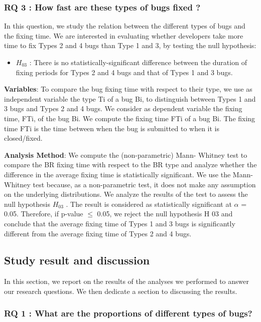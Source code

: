 \subsubsection{RQ 3 : How fast are these types of bugs fixed ?}

In this question, we study the relation between the
different types of bugs and the fixing time. We are interested
in evaluating whether developers take more time to fix Types
2 and 4 bugs than Type 1 and 3, by testing the null hypothesis:

\begin{itemize}
	\item $H_{03}$ : There is no statistically-significant difference
between the duration of fixing periods for Types 2 and
4 bugs and that of Types 1 and 3 bugs.
\end{itemize}


{\bf Variables}: To compare the bug fixing time with respect to
their type, we use as independent variable the type Ti of a
bug Bi, to distinguish between Types 1 and 3 bugs and Types
2 and 4 bugs. We consider as dependent variable the fixing
time, FTi, of the bug Bi. We compute the fixing time FTi of a
bug Bi. The fixing time FTi is the time between when the bug
is submitted to when it is closed/fixed.

{\bf Analysis Method}: We compute the (non-parametric) Mann-
Whitney test to compare the BR fixing time with respect to
the BR type and analyze whether the difference in the average
fixing time is statistically significant. We use the Mann-
Whitney test because, as a non-parametric test, it does not
make any assumption on the underlying distributions. We
analyze the results of the test to assess the null hypothesis
$H_{03}$ . The result is considered as statistically significant at $\alpha$ =
0.05. Therefore, if p-value $\le$ 0.05, we reject the null
hypothesis H 03 and conclude that the average fixing time of
Types 1 and 3 bugs is significantly different from the average
fixing time of Types 2 and 4 bugs.

\subsection{Study result and discussion}

In this section, we report on the results of the analyses we
performed to answer our research questions. We then dedicate
a section to discussing the results.

\subsubsection{RQ 1 : What are the proportions of different types of
bugs?}

